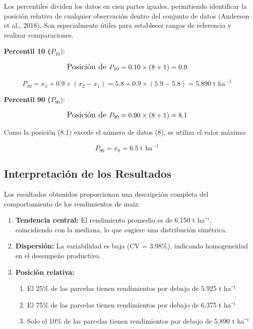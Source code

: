\documentclass[
  spanish,
  letterpaper,
]{book}
\providecommand{\tightlist}{%
  \setlength{\itemsep}{0pt}\setlength{\parskip}{0pt}}
\begin{document}
Los percentiles dividen los datos en cien partes iguales, permitiendo
identificar la posición relativa de cualquier observación dentro del
conjunto de datos (Anderson et al., 2018). Son especialmente útiles para
establecer rangos de referencia y realizar comparaciones.

\textbf{Percentil 10 (}\(P_{10}\)):

\[\large\text{Posición de } P_{10} = 0.10 \times (8+1) = 0.9\]

\[P_{10} = x_1 + 0.9 \times (x_2 - x_1) = 5.8 + 0.9 \times (5.9 - 5.8) = 5.890\; \text{t ha}^{-1}\]

\textbf{Percentil 90 (}\(P_{90}\)):

\[\large\text{Posición de } P_{90} = 0.90 \times (8+1) = 8.1\]

Como la posición (8.1) excede el número de datos (8), se utiliza el
valor máximo:

\[P_{90} = x_8 = 6.5\; \text{t ha}^{-1}\]

\subsection{Interpretación de los
Resultados}\label{interpretaciuxf3n-de-los-resultados}

Los resultados obtenidos proporcionan una descripción completa del
comportamiento de los rendimientos de maíz:

\begin{enumerate}
\def\labelenumi{\arabic{enumi}.}
\item
  \textbf{Tendencia central:} El rendimiento promedio es de 6.150 t
  ha⁻¹, coincidiendo con la mediana, lo que sugiere una distribución
  simétrica.
\item
  \textbf{Dispersión:} La variabilidad es baja (CV = 3.98\%), indicando
  homogeneidad en el desempeño productivo.
\item
  \textbf{Posición relativa:}

  \begin{enumerate}
  \def\labelenumii{\alph{enumii}.}
  \tightlist
  \item
    El 25\% de las parcelas tienen rendimientos por debajo de 5.925 t
    ha⁻¹
  \item
    El 75\% de las parcelas tienen rendimientos por debajo de 6.375 t
    ha⁻¹
  \item
    Solo el 10\% de las parcelas tienen rendimientos por debajo de 5.890
    t ha⁻¹
  \end{enumerate}
\end{enumerate}
\end{document}
